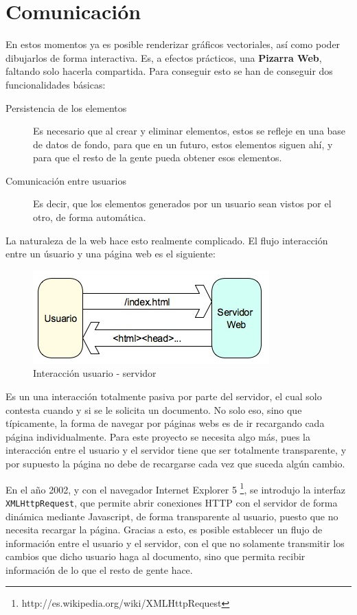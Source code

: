 \section{Comunicación} %
\label{sec:javascript_comunicacion}
En estos momentos ya es posible renderizar gráficos vectoriales, así como poder dibujarlos de forma interactiva. Es, a efectos prácticos, una \textbf{Pizarra Web}, faltando solo hacerla compartida. Para conseguir esto se han de conseguir dos funcionalidades básicas:

\begin{description}
  \item[Persistencia de los elementos] Es necesario que al crear y eliminar elementos, estos se refleje en una base de datos de fondo, para que en un futuro, estos elementos siguen ahí, y para que el resto de la gente pueda obtener esos elementos.
  \item[Comunicación entre usuarios] Es decir, que los elementos generados por un usuario sean vistos por el otro, de forma automática.
\end{description}

La naturaleza de la web hace esto realmente complicado. El flujo interacción entre un úsuario y una página web es el siguiente:

\begin{figure}[h!]
\centering
\includegraphics{navigation.png}
\caption{Interacción usuario - servidor}\label{fig:navigation}
\end{figure}

Es un una interacción totalmente pasiva por parte del servidor, el cual solo contesta cuando y si se le solicita un documento. No solo eso, sino que típicamente, la forma de navegar por páginas webs es de ir recargando cada página individualmente. Para este proyecto se necesita algo más, pues la interacción entre el usuario y el servidor tiene que ser totalmente transparente, y por supuesto la página no debe de recargarse cada vez que suceda algún cambio.

En el año 2002, y con el navegador Internet Explorer 5 \footnote{http://es.wikipedia.org/wiki/XMLHttpRequest}, se introdujo la interfaz \texttt{XMLHttpRequest}, que permite abrir conexiones  HTTP con el servidor de forma dinámica mediante Javascript, de forma transparente al usuario, puesto que no necesita recargar la página. Gracias a esto, es posible establecer un flujo de información entre el usuario y el servidor, con el que no solamente transmitir los cambios que dicho usuario haga al documento, sino que permita recibir información de lo que el resto de gente hace.



